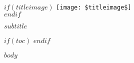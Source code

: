 \documentclass[a4paper,twoside,openright,titlepage,
               headinclude,,footinclude,BCOR5mm,
               numbers=noenddot,cleardoublepage=empty,
               tablecaptionabove]{scrreprt}
\begin{document}
\begin{titlepage}
    \begin{center}
        {\LARGE  

        \hfill

        \vfill

        {} \\ \bigskip

        {\color{Maroon}} 

        }

        \vfill

        
        $if(titleimage)$
            \texttt{[image: \$titleimage\$]} \\ \bigskip
        $endif$

		$subtitle$

        \vfill                      

    \end{center}        
\end{titlepage}

\pagestyle{plain}

$if(toc)$
\tableofcontents
$endif$

$body$
\end{document}
